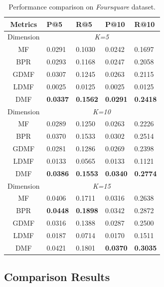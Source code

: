 \begin{table}[t]
\centering
\caption{Performance comparison on \emph{Foursquare} dataset.}
\label{Foursquare}
\begin{tabular}{|c|p{1.15cm}<{\centering}|p{1.15cm}<{\centering}|p{1.15cm}<{\centering}|p{1.15cm}<{\centering}|}
 \hline
   Metrics & P@5 & R@5 & P@10 & R@10 \\
  \hline
  \hline
  Dimension & \multicolumn{4}{c|}{\emph{K=5}} \\
  \hline
  MF & 0.0291 & 0.1030 & 0.0242 & 0.1697 \\
  \hline
  BPR & 0.0293 & 0.1168 & 0.0247 & 0.2058 \\
  \hline
  GDMF & 0.0307 & 0.1245 & 0.0263 & 0.2115 \\
  \hline
  LDMF & 0.0025 & 0.0125 & 0.0025 & 0.0125 \\
  \hline
  DMF & \textbf{0.0337} & \textbf{0.1562} & \textbf{0.0291} & \textbf{0.2418} \\
  \hline
  \hline
  Dimension & \multicolumn{4}{c|}{\emph{K=10}} \\
  \hline
  MF & 0.0289 & 0.1250 & 0.0263 & 0.2226 \\
  \hline
  BPR & 0.0370 & 0.1533 & 0.0302 & 0.2514 \\
  \hline
  GDMF & 0.0281 & 0.1286 & 0.0269 & 0.2398 \\
  \hline
  LDMF & 0.0133 & 0.0565 & 0.0133 & 0.1121 \\
  \hline
  DMF & \textbf{0.0386} & \textbf{0.1553} & \textbf{0.0340} & \textbf{0.2774} \\
  \hline
  \hline
  Dimension & \multicolumn{4}{c|}{\emph{K=15}} \\
  \hline
  MF & 0.0406 & 0.1711 & 0.0316 & 0.2638 \\
  \hline
  BPR & \textbf{0.0448} & \textbf{0.1898} & 0.0342 & 0.2872 \\
  \hline
  GDMF & 0.0316 & 0.1388 & 0.0287 & 0.2500  \\
  \hline
  LDMF & 0.0187 & 0.0714 & 0.0170 & 0.1511 \\
  \hline
  DMF & 0.0421 & 0.1801 & \textbf{0.0370} & \textbf{0.3035} \\
  \hline
\end{tabular}
\end{table}

\subsection{Comparison Results}

